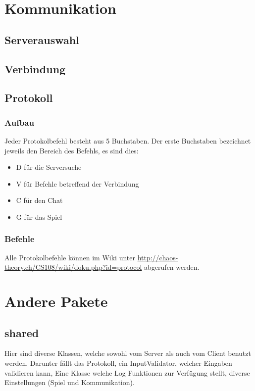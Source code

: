 \documentclass[ngerman, 12pt, pdftex]{scrartcl}[2006/07/30]
\begin{document}
\section{Kommunikation}
\subsection{Serverauswahl}


\subsection{Verbindung}


\subsection{Protokoll}
\subsubsection{Aufbau}
Jeder Protokolbefehl besteht aus 5 Buchstaben. Der erste Buchstaben bezeichnet jeweils den Bereich des Befehls, es sind dies:
\begin{itemize}
\item D für die Serversuche
\item V für Befehle betreffend der Verbindung
\item C für den Chat
\item G für das Spiel
\end{itemize}
\subsubsection{Befehle}
Alle Protokolbefehle können im Wiki unter \url{http://chaos-theory.ch/CS108/wiki/doku.php?id=protocol} abgerufen werden.

\section{Andere Pakete}
\subsection{shared}
Hier sind diverse Klassen, welche sowohl vom Server als auch vom Client benutzt werden.
Darunter fällt das Protokoll, ein InputValidator, welcher Eingaben validieren kann, Eine Klasse welche Log Funktionen zur Verfügung stellt,
diverse Einstellungen (Spiel und Kommunikation).
\end{document}
